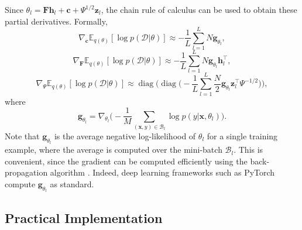 \documentclass[msc,deptreport.inf]{infthesis} %
\newcommand{\matr}[1]{\mathbf{#1}}
\newcommand{\E}{\mathbb E}
\newcommand{\diag}{\mathop{\mathrm{diag}}}
\begin{document}
Since $\theta_l = \matr{F}\matr{h}_l + \matr{c} + \Psi^{1/2} \matr{z}_l$, the chain rule of calculus can be used to obtain these partial derivatives. Formally,
\begin{equation}
	 \nabla_\matr{c} \E_{q(\theta)} [\log p(\mathcal{D} | \theta)]
	 \approx -\frac{1}{L} \sum_{l=1}^{L} N \matr{g}_{\theta_l},
\end{equation}
\begin{equation}
	 \nabla_\matr{F} \E_{q(\theta)} [\log p(\mathcal{D} | \theta)]
	 \approx -\frac{1}{L} \sum_{l=1}^{L} N \matr{g}_{\theta_l} \matr{h}_l^\intercal,
\end{equation}
\begin{equation}\label{eqn:grad_likelihood_wrt_psi}
	 \nabla_\Psi \E_{q(\theta)} [\log p(\mathcal{D} | \theta)]
	 \approx \diag\Bigg( \diag\Bigg( -\frac{1}{L} \sum_{l=1}^{L} \frac{N}{2} \matr{g}_{\theta_l} \matr{z}_l^\intercal \Psi^{-1/2} \Bigg)\Bigg),
\end{equation}
where
\begin{equation}
	\matr{g}_{\theta_l} = \nabla_{\theta_l} \Bigg( -\frac{1}{M} \sum_{(\matr{x}, y) \in \mathcal{B}_l} \log p(y | \matr{x}, \theta_l) \Bigg).
\end{equation}
Note that $\matr{g}_{\theta_l}$ is the average negative log-likelihood of $\theta_l$ for a single training example, where the average is computed over the mini-batch $\mathcal{B}_l$. This is convenient, since the gradient can be computed efficiently using the back-propagation algorithm \cite{rumelhart1986}. Indeed, deep learning frameworks such as PyTorch \cite{paszke2019} compute $\matr{g}_{\theta_l}$ as standard. 


\subsection{Practical Implementation}
\end{document}
